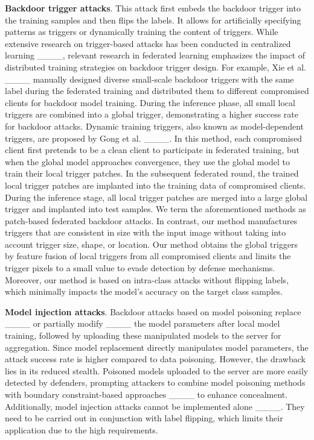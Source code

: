 \textbf{Backdoor trigger attacks}. This attack first embeds the backdoor trigger into the training samples and then flips the labels. It allows for artificially specifying patterns as triggers or dynamically training the content of triggers. While extensive research on trigger-based attacks has been conducted in centralized learning ____, relevant research in federated learning emphasizes the impact of distributed training strategies on backdoor trigger design. For example, Xie et al. ____ manually designed diverse small-scale backdoor triggers with the same label during the federated training and distributed them to different compromised clients for backdoor model training. During the inference phase, all small local triggers are combined into a global trigger, demonstrating a higher success rate for backdoor attacks. Dynamic training triggers, also known as model-dependent triggers, are proposed by Gong et al. ____. In this method, each compromised client first pretends to be a clean client to participate in federated training, but when the global model approaches convergence, they use the global model to train their local trigger patches. In the subsequent federated round, the trained local trigger patches are implanted into the training data of compromised clients. During the inference stage, all local trigger patches are merged into a large global trigger and implanted into test samples. We term the aforementioned methods as patch-based federated backdoor attacks. In contrast, our method manufactures triggers that are consistent in size with the input image without taking into account trigger size, shape, or location. Our method obtains the global triggers by feature fusion of local triggers from all compromised clients and limits the trigger pixels to a small value to evade detection by defense mechanisms. Moreover, our method is based on intra-class attacks without flipping labels, which minimally impacts the model's accuracy on the target class samples.

\textbf{Model injection attacks}. Backdoor attacks based on model poisoning replace ____ or partially modify ____ the model parameters after local model training, followed by uploading these manipulated models to the server for aggregation. Since model replacement directly manipulates model parameters, the attack success rate is higher compared to data poisoning. However, the drawback lies in its reduced stealth. Poisoned models uploaded to the server are more easily detected by defenders, prompting attackers to combine model poisoning methods with boundary constraint-based approaches ____ to enhance concealment. Additionally, model injection attacks cannot be implemented alone ____. They need to be carried out in conjunction with label flipping, which limits their application due to the high requirements.

